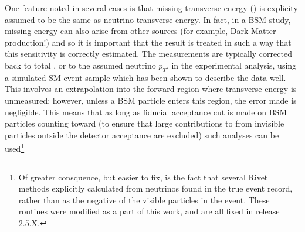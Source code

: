 \documentclass[floatfix]{article}
\begin{document}
One feature noted in several cases is that missing transverse energy (\MET) is 
explicity assumed to be the same as neutrino transverse energy. In fact, in a BSM study, missing energy can also 
arise from other sources (for example, Dark Matter production!) and so it is important that the result is treated in such a 
way that this sensitivity is correctly estimated. The measurements are typically corrected back to total \MET, 
or to the assumed neutrino $p_T$, in the experimental analysis, using a simulated SM event sample which has been shown to describe
the data well. This involves an extrapolation into the forward 
region where transverse energy is unmeasured; however, unless a BSM particle enters this region, the error made is 
negligible. This means that as long as fiducial acceptance cut is made on BSM particles counting toward \MET (to ensure that 
large contributions to \MET 
from invisible particles outside the detector acceptance are excluded) such analyses can be 
used\footnote{Of greater consquence, but easier to fix, is the fact that several Rivet methods explicitly calculated \MET
from neutrinos found in the true event record, rather than as the negative of the visible particles in the event. These 
routines were modified as a part of this work, and are all fixed in release 2.5.X.}
\end{document}
